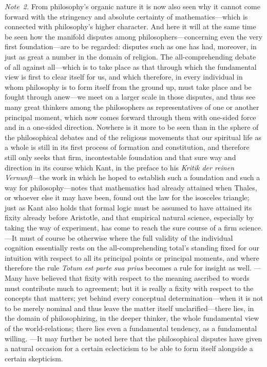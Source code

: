 \documentclass[12pt,a4paper]{book}
\begin{document}
{\small\emph{Note~2.} From philosophy's organic nature it is now also seen why it
cannot come forward with the stringency and absolute certainty of mathematics---which
is connected with philosophy's higher character. And here it will at the same time
be seen how the manifold disputes among philosophers---concerning even the very first
foundation---are to be regarded: disputes such as one has had, moreover, in just as
great a number in the domain of religion. The all-comprehending debate of all against
all---which is to take place as that through which the fundamental view is first to
clear itself for us, and which therefore, in every individual in whom philosophy is
to form itself from the ground up, must take place and be fought through anew---we
meet on a larger scale in those disputes, and thus see many great thinkers among the
philosophers as representatives of one or another principal moment, which now comes
forward through them with one-sided force and in a one-sided direction. Nowhere is it
more to be seen than in the sphere of the philosophical debates and of the religious
movements that our spiritual life as a whole is still in its first process of
formation and constitution, and therefore still only seeks that firm, incontestable
foundation and that sure way and direction in its course which Kant, in the preface
to his \textit{Kritik der reinen Vernunft}---the work in which he hoped to establish
such a foundation and such a way for philosophy---notes that mathematics had already
attained when Thales, or whoever else it may have been, found out the law for the
isosceles triangle; just as Kant also holds that formal logic must be assumed to have
attained its fixity already before Aristotle, and that empirical natural science,
especially by taking the way of experiment, has come to reach the sure course of a
firm science. ---It must of course be otherwise where the full validity of the
individual cognition essentially rests on the all-comprehending total's standing
fixed for our intuition with respect to all its principal points or principal
moments, and where therefore the rule \textit{Totum est parte sua prius} becomes a
rule for insight as well. ---Many have believed that fixity with respect to the
meaning ascribed to words must contribute much to agreement; but it is really a
fixity with respect to the concepts that matters; yet behind every conceptual
determination---when it is not to be merely nominal and thus leave the matter itself
unclarified---there lies, in the domain of philosophizing, in the deeper thinker, the
whole fundamental view of the world-relations; there lies even a fundamental
tendency, as a fundamental willing. ---It may further be noted here that the
philosophical disputes have given a natural occasion for a certain eclecticism to be
able to form itself alongside a certain skepticism.\par}
\end{document}
